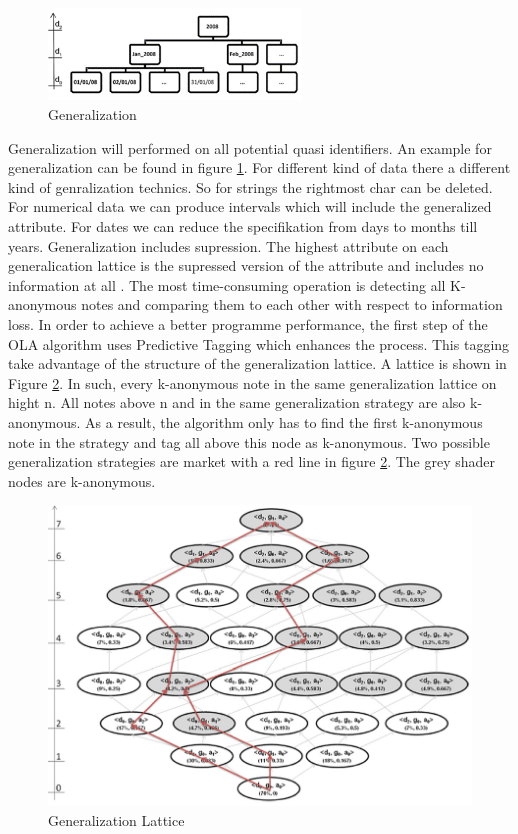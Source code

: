 \documentclass{llncs}
\begin{document}
\begin{figure}
	\centering
	\includegraphics[width=0.6\textwidth]{general1.png}
	\caption{Generalization}%
	\label{Generalization}
\end{figure}



Generalization will performed on all potential quasi identifiers. An example for generalization can be found in figure \ref{Generalization}. For different kind of data there a different kind of genralization technics. So for strings the rightmost char can be deleted. For numerical data we can produce intervals which will include the generalized attribute. For dates we can reduce the specifikation from days to months till years. Generalization includes supression. The highest attribute on each generalication lattice is the supressed version of the attribute and includes no information at all \cite{el2009globally}. The most time-consuming operation is detecting all K-anonymous notes and comparing them to each other with respect to information loss. In order to achieve a better programme performance, the first step of the OLA algorithm uses Predictive Tagging which enhances the process.  This tagging take advantage of the structure of the generalization lattice. A lattice is shown in Figure \ref{lattice}. In such, every k-anonymous note in the same generalization lattice on hight n. All notes above n and in the same generalization strategy are also k-anonymous. As a result, the algorithm only has to find the first k-anonymous note in the strategy and tag all above this node as k-anonymous. Two possible generalization strategies are market with a red line in figure \ref{lattice}. The grey shader nodes are k-anonymous.


\begin{figure}
	\centering
	\includegraphics[width=1.0\textwidth]{lattice.png}
	\caption{Generalization Lattice}%
	\label{lattice}
\end{figure}
\end{document}
